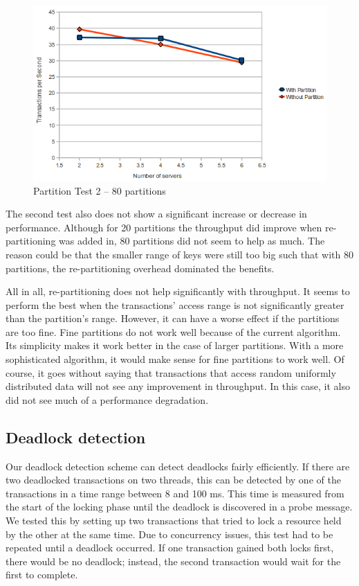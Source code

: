 \documentclass[a4paper, 10pt, notitlepage]{article}
\begin{document}
\begin{figure}[h!]

  \centering
    \includegraphics[scale=0.7]{peval4.png}
  \caption{Partition Test 2 -- 80 partitions}
\end{figure}

The second test also does not show a significant increase or decrease in performance. Although for 20 partitions 
the throughput did improve when re-partitioning was added in, 80 partitions did not seem to help as much. The reason
could be that the smaller range of keys were still too big such that with 80 partitions, the re-partitioning
overhead dominated the benefits.

All in all, re-partitioning does not help significantly with throughput. It seems to perform the best when 
the transactions' access range is not significantly greater than the partition's range. However, it can have
a worse effect if the partitions are too fine. Fine partitions do not work well because of the current algorithm.
Its simplicity makes it work better in the case of larger partitions. With a more sophisticated algorithm,
it would make sense for fine partitions to work well. Of course, it goes without saying that transactions that
access random uniformly distributed data will not see any improvement in throughput. In this case, it also
did not see much of a performance degradation.

\subsection{Deadlock detection}
Our deadlock detection scheme can detect deadlocks fairly efficiently. If there are two deadlocked transactions on two threads, this can be detected by one of the transactions in a time range between 8 and 100 ms. This time is measured from the start of the locking phase until the deadlock is discovered in a probe message. We tested this by setting up two transactions that tried to lock a resource held by the other at the same time. Due to concurrency issues, this test had to be repeated until a deadlock occurred. If one transaction gained both locks first, there would be no deadlock; instead, the second transaction would wait for the first to complete.
\end{document}
